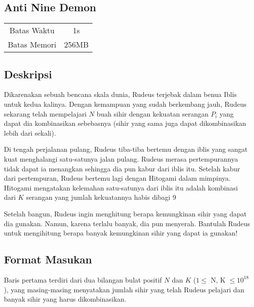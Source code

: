 \documentclass{article}
\begin{document}
\begin{center}

    
    \section*{Anti Nine Demon} %

    \begin{tabular}{ | c c | }
        \hline
        Batas Waktu  & 1s \\    %
        Batas Memori & 256MB \\  %
        \hline
    \end{tabular}
\end{center}

\subsection*{Deskripsi}

Dikarenakan sebuah bencana skala dunia, Rudeus terjebak dalam benua Iblis untuk kedua kalinya. Dengan kemampuan yang sudah berkembang jauh, Rudeus sekarang telah mempelajari $N$ buah sihir dengan kekuatan serangan $P_{i}$ yang dapat dia kombinasikan sebebasnya (sihir yang sama juga dapat dikombinasikan lebih dari sekali). 

Di tengah perjalanan pulang, Rudeus tiba-tiba bertemu dengan iblis yang sangat kuat menghalangi satu-satunya jalan pulang. Rudeus merasa pertempurannya tidak dapat ia menangkan sehingga dia pun kabur dari iblis itu. Setelah kabur dari pertempuran, Rudeus bertemu lagi dengan Hitogami dalam mimpinya. Hitogami mengatakan kelemahan satu-satunya dari iblis itu adalah kombinasi dari $K$ serangan yang jumlah kekuatannya habis dibagi 9

Setelah bangun, Rudeus ingin menghitung berapa kemungkinan sihir yang dapat dia gunakan. Namun, karena terlalu banyak, dia pun menyerah. Bantulah Rudeus untuk mengihitung berapa banyak kemungkinan sihir yang dapat ia gunakan!

\subsection*{Format Masukan}

Baris pertama terdiri dari dua bilangan bulat positif $N$ dan $K$ ($1 \leq$ N, K $\leq 10^{18}$), yang masing-masing menyatakan jumlah sihir yang telah Rudeus pelajari dan banyak sihir yang harus dikombinasikan.
\end{document}

